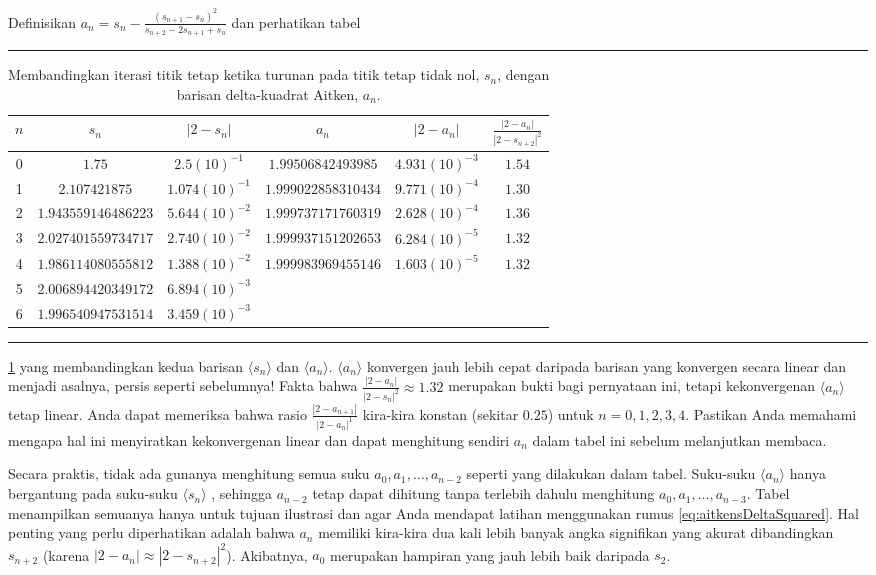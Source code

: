 Definisikan $a_{n}=s_{n}-\frac{(s_{n+1}-s_{n})^{2}}{s_{n+2}-2s_{n+1}+s_{n}}$
dan perhatikan tabel 
\begin{table}[h]
\hrule \caption{\label{tab:fixedPointAitkens}Membandingkan iterasi titik tetap ketika
turunan pada titik tetap tidak nol, $s_{n}$, dengan barisan delta-kuadrat
Aitken, $a_{n}$.}

\centering{}\medskip{}
\begin{tabular}{c|ccccc}
$n$ & $s_{n}$ & $|2-s_{n}|$ & $a_{n}$ & $|2-a_{n}|$ & $\frac{|2-a_{n}|}{|2-s_{n+2}|^{2}}$\tabularnewline
\hline 
0 & $1.75$ & $2.5(10)^{-1}$ & $1.99506842493985$ & $4.931(10)^{-3}$ & $1.54$\tabularnewline
1 & $2.107421875$ & $1.074(10)^{-1}$ & $1.999022858310434$ & $9.771(10)^{-4}$ & $1.30$\tabularnewline
2 & $1.943559146486223$ & $5.644(10)^{-2}$ & $1.999737171760319$ & $2.628(10)^{-4}$ & $1.36$\tabularnewline
3 & $2.027401559734717$ & $2.740(10)^{-2}$ & $1.999937151202653$ & $6.284(10)^{-5}$ & $1.32$\tabularnewline
4 & $1.986114080555812$ & $1.388(10)^{-2}$ & $1.999983969455146$ & $1.603(10)^{-5}$ & $1.32$\tabularnewline
5 & $2.006894420349172$ & $6.894(10)^{-3}$ &  &  & \tabularnewline
6 & $1.996540947531514$ & $3.459(10)^{-3}$ &  &  & \tabularnewline
\end{tabular}\medskip{}
\hrule 
\end{table}
 \ref{tab:fixedPointAitkens} yang membandingkan kedua barisan $\langle s_{n}\rangle$
dan $\langle a_{n}\rangle$. $\langle a_{n}\rangle$ konvergen jauh
lebih cepat daripada barisan yang konvergen secara linear dan menjadi
asalnya, persis seperti sebelumnya! Fakta bahwa $\frac{|2-a_{n}|}{|2-s_{n}|^{2}}\approx1.32$
merupakan bukti bagi pernyataan ini, tetapi kekonvergenan $\langle a_{n}\rangle$
tetap linear. Anda dapat memeriksa bahwa rasio $\frac{|2-a_{n+1}|}{|2-a_{n}|^{1}}$
kira-kira konstan (sekitar $0.25$) untuk $n=0,1,2,3,4$. Pastikan
Anda memahami mengapa hal ini menyiratkan kekonvergenan linear dan
dapat menghitung sendiri $a_{n}$ dalam tabel ini sebelum melanjutkan
membaca.

Secara praktis, tidak ada gunanya menghitung semua suku $a_{0},a_{1},\ldots,a_{n-2}$
seperti yang dilakukan dalam tabel. Suku-suku $\langle a_{n}\rangle$
hanya bergantung pada suku-suku $\langle s_{n}\rangle$ , sehingga
$a_{n-2}$ tetap dapat dihitung tanpa terlebih dahulu menghitung $a_{0},a_{1},\ldots,a_{n-3}$.
Tabel menampilkan semuanya hanya untuk tujuan ilustrasi dan agar Anda
mendapat latihan menggunakan rumus \ref{eq:aitkensDeltaSquared}.
Hal penting yang perlu diperhatikan adalah bahwa $a_{n}$ memiliki
kira-kira dua kali lebih banyak angka signifikan yang akurat dibandingkan
$s_{n+2}$ (karena $|2-a_{n}|\approx|2-s_{n+2}|^{2}$). Akibatnya,
$a_{0}$ merupakan hampiran yang jauh lebih baik daripada $s_{2}$. 

